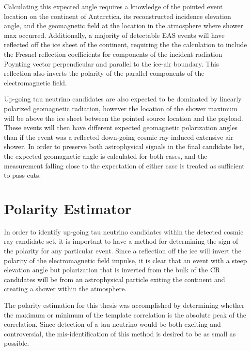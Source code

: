 		Calculating this expected angle requires a knowledge of the pointed event location on the continent of Antarctica, its reconstructed incidence elevation angle, and the geomagnetic field at the location in the atmosphere where shower max occurred.  Additionally, a majority of detectable EAS events will have reflected off the ice sheet of the continent, requiring the the calculation to include the Fresnel reflection coefficients for components of the incident radiation Poynting vector perpendicular and parallel to the ice-air boundary.  This reflection also inverts the polarity of the parallel components of the electromagnetic field.
		
		Up-going tau neutrino candidates are also expected to be dominated by linearly polarized geomagnetic radiation, however the location of the shower maximum will be above the ice sheet between the pointed source location and the payload.  These events will then have different expected geomagnetic polarization angles than if the event was a reflected down-going cosmic ray induced extensive air shower.  In order to preserve both astrophysical signals in the final candidate list, the expected geomagnetic angle is calculated for both cases, and the measurement falling close to the expectation of either case is treated as sufficient to pass cuts.
		
		
\section{Polarity Estimator}
	In order to identify up-going tau neutrino candidates within the detected cosmic ray candidate set, it is important to have a method for determining the sign of the polarity for any particular event.  Since a reflection off the ice will invert the polarity of the electromagnetic field impulse, it is clear that an event with a steep elevation angle but polarization that is inverted from the bulk of the CR candidates will be from an astrophysical particle exiting the continent and creating a shower within the atmosphere.
	
	The polarity estimation for this thesis was accomplished by determining whether the maximum or minimum of the template correlation is the absolute peak of the correlation.  Since detection of a tau neutrino would be both exciting and controversial, the mis-identification of this method is desired to be as small as possible.

		
